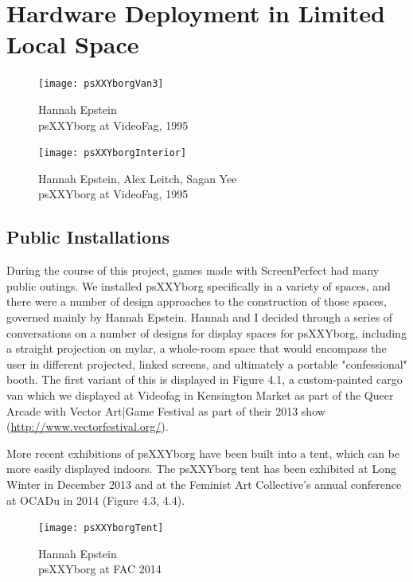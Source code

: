 
\chapter{Hardware Deployment in Limited Local Space}\thispagestyle{empty} %

\label{Chapter4} 

\begin{figure}[!ht]
 \centering
  \texttt{[image: psXXYborgVan3]}
  \caption{Hannah Epstein\\ psXXYborg at VideoFag, 1995}
\end{figure}

\begin{figure}[!ht]
 \centering
  \texttt{[image: psXXYborgInterior]}
  \caption{Hannah Epstein, Alex Leitch, Sagan Yee\\ psXXYborg at VideoFag, 1995}
\end{figure}
\newpage
\newpage

\section{Public Installations}
During the course of this project, games made with ScreenPerfect had many public outings. We installed psXXYborg specifically in a variety of spaces, and there were a number of design approaches to the construction of those spaces, governed mainly by Hannah Epstein. Hannah and I decided through a series of conversations on a number of designs for display spaces for psXXYborg, including a straight projection on mylar, a whole-room space that would encompass the user in different projected, linked screens, and ultimately a portable "confessional" booth. The first variant of this is displayed in Figure 4.1, a custom-painted cargo van which we displayed at Videofag in Kensington Market as part of the Queer Arcade with Vector Art|Game Festival as part of their 2013 show (\url{http://www.vectorfestival.org/}).

More recent exhibitions of psXXYborg have been built into a tent, which can be more easily displayed indoors. The psXXYborg tent has been exhibited at Long Winter in December 2013 and at the Feminist Art Collective's annual conference at OCADu in 2014 (Figure 4.3, 4.4).

\newpage
\begin{figure}[!ht]
 \centering
  \texttt{[image: psXXYborgTent]}
  \caption{Hannah Epstein\\psXXYborg at FAC 2014}
\end{figure}

